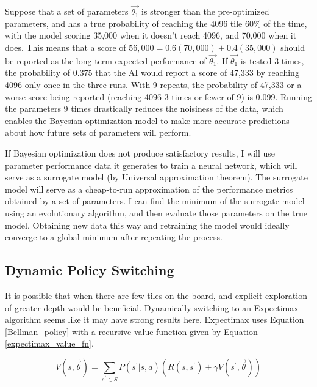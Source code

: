 \documentclass{article}
\begin{document}
Suppose that a set of parameters $\vec{\theta_1}$ is stronger than the pre-optimized parameters, and has a true probability of reaching the 4096 tile 60\% of the time, with the model scoring 35,000 when it doesn't reach 4096, and 70,000 when it does.  This means that a score of $56,000 = 0.6(70,000) + 0.4(35,000)$ should be reported as the long term expected performance of $\vec{\theta_1}$.  If $\vec{\theta_1}$ is tested 3 times, the probability of 0.375 that the AI would report a score of 47,333 by reaching 4096 only once in the three runs.   With 9 repeats, the probability of 47,333 or a worse score being reported (reaching 4096 3 times or fewer of 9) is 0.099.  Running the parameters 9 times drastically reduces the noisiness of the data, which enables the Bayesian optimization model to make more accurate predictions about how future sets of parameters will perform.
\\


If Bayesian optimization does not produce satisfactory results, I will use parameter performance data it generates to train a neural network, which will serve as a surrogate model (by Universal approximation theorem).  The surrogate model will serve as a cheap-to-run approximation of the performance metrics obtained by a set of parameters.  I can find the minimum of the surrogate model using an evolutionary algorithm, and then evaluate those parameters on the true model.  Obtaining new data this way and retraining the model would ideally converge to a global minimum after repeating the process.

\subsection{Dynamic Policy Switching}
It is possible that when there are few tiles on the board, and explicit exploration of greater depth would be beneficial.  Dynamically switching to an Expectimax algorithm seems like it may have strong results here.  Expectimax uses Equation \ref{Bellman_policy} with a recursive value function given by Equation  \ref{expectimax_value_fn}.

\begin{equation}
\label{expectimax_value_fn}
V(s, \vec{\theta}) = \sum_{s^\prime \in S} P(s^\prime|s, a)(R(s, s^\prime) + \gamma V(s^\prime, \vec{\theta}))
\end{equation}
\end{document}
